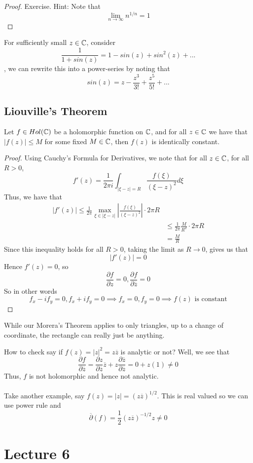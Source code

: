 \documentclass{article}
\begin{document}
\begin{proof}
    Exercise. Hint: Note that
    \[\lim_{n \to \infty} n^{1/n} = 1\]
\end{proof}

\begin{example}
    For sufficiently small $z \in \mathbb{C}$, consider
    \[\frac{1}{1 + sin(z)} = 1 - sin(z) + sin^2(z) + ...\]
    , we can rewrite this into a power-series by noting that
    \[sin(z) = z - \frac{z^3}{3!} + \frac{z^5}{5!} + ...\]
\end{example}

\subsection{Liouville's Theorem}

\begin{theorem}
    Let $f \in Hol(\mathbb{C})$ be a holomorphic function on $\mathbb{C}$, and for all $z \in \mathbb{C}$ we have that $|f(z)| \leq M$ for some fixed $M \in \mathbb{C}$, then $f(z)$ is identically constant.
\end{theorem}

\begin{proof}
Using Cauchy's Formula for Derivatives, we note that for all $z \in \mathbb{C}$, for all $R > 0$,
\[f'(z) = \frac{1}{2\pi i} \int_{|\xi - z| = R} \frac{f(\xi)}{(\xi - z)^2} d\xi\]
Thus, we have that
\begin{align*}
    |f'(z)| \leq \frac{1}{2\pi} \max_{\xi \in |\xi - z|} |\frac{f(\xi)}{(\xi - z)^2}| \cdot 2 \pi R\\
    &\leq \frac{1}{2\pi} \frac{M}{R^2} \cdot 2 \pi R \tag*{Since $f$ is bounded}\\
    &= \frac{M}{R}
\end{align*}
Since this inequality holds for all $R > 0$, taking the limit as $R \to 0$, gives us that
\[|f'(z)| = 0\]
Hence $f'(z) = 0$, so
\[\frac{\partial f}{\partial z} = 0, \frac{\partial f}{\partial \overline{z}} = 0\]
So in other words
\[f_x - i f_y = 0, f_x + i f_y = 0 \implies f_x = 0, f_y = 0 \implies f(z) \text{ is constant}\]
\end{proof}

\begin{remark}
    While our Morera's Theorem applies to only triangles, up to a change of coordinate, the rectangle can really just be anything.
\end{remark}

\begin{remark}
    How to check say if $f(z) = |z|^2 = z \overline{z}$ is analytic or not? Well, we see that
    \[\frac{\partial f}{\partial \overline{z}} = \frac{\partial z}{\partial \overline{z}} \overline{z} + z \frac{\partial \overline{z}}{\partial \overline{z}} = 0 + z(1) \neq 0\]
    Thus, $f$ is not holomorphic and hence not analytic.\\\\
    Take another example, say $f(z) = |z| = (z \overline{z})^{1/2}$. This is real valued so we can use power rule and
    \[\overline{\partial}(f) = \frac{1}{2}(z \overline{z})^{-1/2} z \neq 0\]
\end{remark}

\newpage

\section{Lecture 6}
\end{document}

